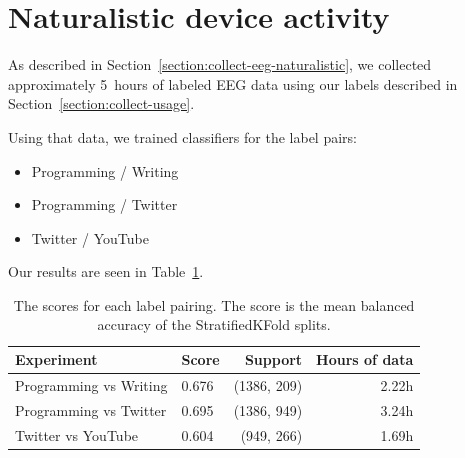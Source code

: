     \section{Naturalistic device activity}

        As described in Section~\ref{section:collect-eeg-naturalistic}, we collected approximately \SI{5}{hours} of labeled EEG data using our labels described in Section~\ref{section:collect-usage}.

        Using that data, we trained classifiers for the label pairs:

        \begin{itemize}
                \item Programming / Writing
                \item Programming / Twitter
                \item Twitter / YouTube
        \end{itemize}

        Our results are seen in Table~\ref{table:scores-natural}.

        \begin{table}[h]
            \centering
            \begin{tabular}{llrr}
                \toprule
                Experiment & Score & Support & Hours of data \\
                \midrule
                Programming vs Writing & 0.676 & (1386, 209) & 2.22h \\
                Programming vs Twitter & 0.695 &  (1386, 949) & 3.24h \\
                Twitter vs YouTube & 0.604 & (949, 266) & 1.69h \\
                \bottomrule
            \end{tabular}
            \caption{The scores for each label pairing. The score is the mean balanced accuracy of the StratifiedKFold splits.}\label{table:scores-natural}
        \end{table}
